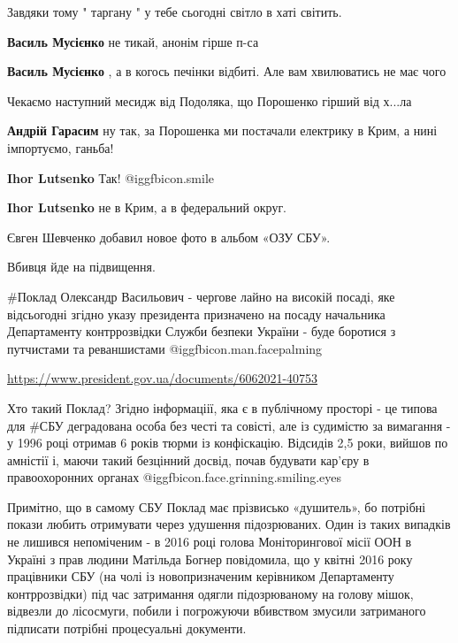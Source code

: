 \begin{itemize}
Завдяки тому " таргану " у тебе сьогодні світло в хаті світить.

\begin{itemize} %
\textbf{Василь Мусієнко} не тикай, анонім гірше п-са

\textbf{Василь Мусієнко} , а в когось печінки відбиті. Але вам хвилюватись не має чого
\end{itemize} %

Чекаємо наступний месидж від Подоляка, що Порошенко гірший від х...ла

\begin{itemize} %
\textbf{Андрій Гарасим} ну так, за Порошенка ми постачали електрику в Крим, а нині імпортуємо, ганьба!

\textbf{Ihor Lutsenko} Так!  @igg{fbicon.smile} 

\textbf{Ihor Lutsenko} не в Крим, а в федеральний округ.
\end{itemize} %


Євген Шевченко добавил новое фото в альбом «ОЗУ СБУ».

Вбивця йде на підвищення.

\#Поклад Олександр Васильович - чергове лайно на високій посаді, яке відсьогодні
згідно указу президента призначено на посаду начальника Департаменту
контррозвідки Служби безпеки України - буде боротися з путчистами та
реваншистами @igg{fbicon.man.facepalming} 

\url{https://www.president.gov.ua/documents/6062021-40753}

Хто такий Поклад? Згідно інформаціії, яка є в публічному просторі - це типова
для \#СБУ деградована особа без честі та совісті, але із судимістю за вимагання
- у 1996 році отримав 6 років тюрми із конфіскацію. Відсидів 2,5 роки, вийшов
по амністії і, маючи такий безцінний досвід, почав будувати кар’єру в
правоохоронних органах @igg{fbicon.face.grinning.smiling.eyes} 

Примітно, що в самому СБУ Поклад має прізвисько «душитель», бо потрібні покази
любить отримувати через удушення підозрюваних. Один із таких випадків не
лишився непоміченим - в 2016 році голова Моніторингової місії ООН в Україні з
прав людини Матільда Богнер повідомила, що у квітні 2016 року
працівники СБУ (на чолі із новопризначеним керівником Департаменту
контррозвідки) під час затримання одягли підозрюваному на голову мішок,
відвезли до лісосмуги, побили і погрожуючи вбивством змусили затриманого
підписати потрібні процесуальні документи.


\end{itemize}
